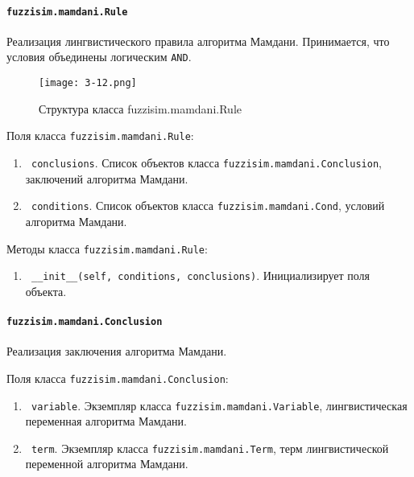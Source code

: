\paragraph{\lstinline!fuzzisim.mamdani.Rule!}

Реализация лингвистического правила алгоритма Мамдани. Принимается, что условия объединены логическим \lstinline!AND!.



\begin{figure}[ht]
	\centering
	\texttt{[image: 3-12.png]}
	\caption{ Структура класса fuzzisim.mamdani.Rule}
\end{figure}

Поля класса \lstinline!fuzzisim.mamdani.Rule!:
\begin{enumerate}[label=\arabic*)]
	\item \lstinline! conclusions!. Список объектов класса \lstinline!fuzzisim.mamdani.Conclusion!, заключений алгоритма Мамдани.
	\item \lstinline! conditions!.  Список объектов класса \lstinline!fuzzisim.mamdani.Cond!, условий алгоритма Мамдани.
\end{enumerate}


Методы класса \lstinline!fuzzisim.mamdani.Rule!:
\begin{enumerate}[label=\arabic*)]
	\item \lstinline! __init__(self, conditions, conclusions)!. Инициализирует поля объекта.
\end{enumerate}



\paragraph{\lstinline!fuzzisim.mamdani.Conclusion!}

Реализация заключения алгоритма Мамдани.

Поля класса \lstinline!fuzzisim.mamdani.Conclusion!:
\begin{enumerate}[label=\arabic*)]
	\item \lstinline! variable!. Экземпляр класса \lstinline!fuzzisim.mamdani.Variable!, лингвистическая переменная алгоритма Мамдани.
	\item \lstinline! term!.   Экземпляр класса  \lstinline!fuzzisim.mamdani.Term!, терм лингвистической переменной алгоритма Мамдани.
\end{enumerate}


